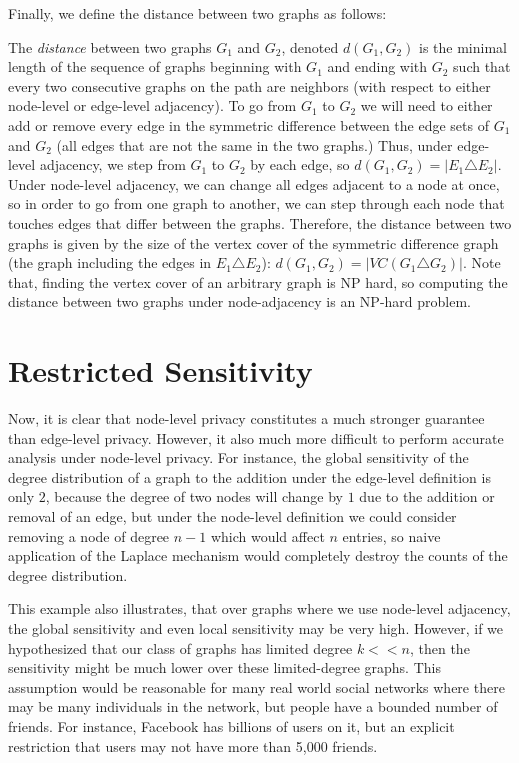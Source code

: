 Finally, we define the distance between two graphs as follows:

\begin{definition}[Distance]
\label{def:graph_distance}
The \emph{distance} between two graphs $G_1$ and $G_2$, denoted $d(G_1, G_2)$ is the minimal length of the sequence of graphs beginning with $G_1$ and ending with $G_2$ such that every two consecutive graphs on the path are neighbors (with respect to either node-level  or edge-level adjacency). To go from $G_1$ to $G_2$ we will need to either add or remove every edge in the symmetric difference between the edge sets of $G_1$ and $G_2$ (all edges that are not the same in the two graphs.)  Thus, under edge-level adjacency, we step from $G_1$ to $G_2$ by each edge, so $d(G_1, G_2) = |E_1 \triangle E_2|$. Under node-level adjacency, we can change all edges adjacent to a node at once, so in order to go from one graph to another, we can step through each node that touches edges that differ between the graphs. Therefore, the distance between two graphs is given by the size of the vertex cover of the symmetric difference graph (the graph including the edges in $E_1 \triangle E_2$): $d(G_1, G_2) = |VC(G_1 \triangle G_2)|$. Note that, finding the vertex cover of an arbitrary graph is NP hard, so computing the distance between two graphs under node-adjacency is an NP-hard problem\cite{BBDS13}.
\end{definition}

\section{Restricted Sensitivity}
\label{sec:restricted_sensitivity}

Now, it is clear that node-level privacy constitutes a much stronger guarantee than edge-level privacy. However, it also much more difficult to perform accurate analysis under node-level privacy. For instance, the global sensitivity of the degree distribution of a graph to the addition under the edge-level definition is only $2$, because the degree of two nodes will change by $1$ due to the addition or removal of an edge, but under the node-level definition we could consider removing a node of degree $n-1$ which would affect $n$ entries, so naive application of the Laplace mechanism would completely destroy the counts of the degree distribution. 

This example also illustrates, that over graphs where we use node-level adjacency, the global sensitivity and even local sensitivity may be very high. However, if we hypothesized that our class of graphs has limited degree $k << n$, then the sensitivity might be much lower over these limited-degree graphs. This assumption would be reasonable for many real world social networks where there may be many individuals in the network, but people have a bounded number of friends. For instance, Facebook has billions of users on it, but an explicit restriction that users may not have more than 5,000 friends.

